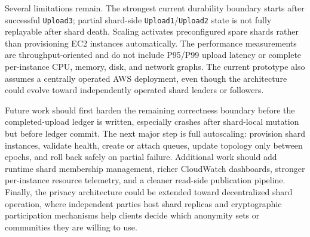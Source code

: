 \documentclass[conference]{IEEEtran}
\begin{document}
Several limitations remain. The strongest current durability boundary starts after successful \texttt{Upload3}; partial shard-side \texttt{Upload1}/\texttt{Upload2} state is not fully replayable after shard death. Scaling activates preconfigured spare shards rather than provisioning EC2 instances automatically. The performance measurements are throughput-oriented and do not include P95/P99 upload latency or complete per-instance CPU, memory, disk, and network graphs. The current prototype also assumes a centrally operated AWS deployment, even though the architecture could evolve toward independently operated shard leaders or followers.

Future work should first harden the remaining correctness boundary before the completed-upload ledger is written, especially crashes after shard-local mutation but before ledger commit. The next major step is full autoscaling: provision shard instances, validate health, create or attach queues, update topology only between epochs, and roll back safely on partial failure. Additional work should add runtime shard membership management, richer CloudWatch dashboards, stronger per-instance resource telemetry, and a cleaner read-side publication pipeline. Finally, the privacy architecture could be extended toward decentralized shard operation, where independent parties host shard replicas and cryptographic participation mechanisms help clients decide which anonymity sets or communities they are willing to use.
\end{document}
